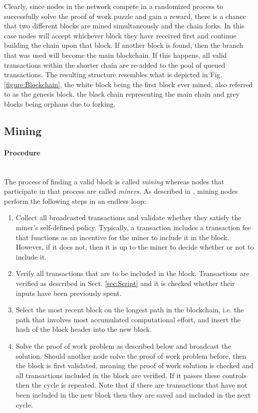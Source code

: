 \noindent
Clearly, since nodes in the network compete in a randomized process to successfully solve the proof of work puzzle and gain a reward, there is a chance that two different blocks are mined simultaneously and the chain forks. In this case nodes will accept whichever block they have received first and continue building the chain upon that block. If another block is found, then the branch that was used will become the main blockchain. If this happens, all valid transactions within the shorter chain are re-added to the pool of queued transactions. The resulting structure resembles what is depicted in Fig. \ref{figure:Blockchain}, the white block being the first block ever mined, also referred to as the genesis block, the black chain representing the main chain and grey blocks being orphans due to forking.

\subsection{Mining} \label{sec:Mining}

\paragraph{Procedure}~\\
The process of finding a valid block is called \emph{mining} whereas nodes that participate in that process are called \emph{miners}. As described in \cite{Clark_BitcoinInternals}, mining nodes perform the following steps in an endless loop:

\begin{enumerate}[label=\arabic*), leftmargin=1cm]
\item Collect all broadcasted transactions and validate whether they satisfy the miner's self-defined policy. Typically, a transaction includes a transaction fee that functions as an incentive for the miner to include it in the block. However, if it does not, then it is up to the miner to decide whether or not to include it.
\item Verify all transactions that are to be included in the block. Transactions are verified as described in Sect. \ref{sec:Script} and it is checked whether their inputs have been previously spent.
\item Select the most recent block on the longest path in the blockchain, i.e. the path that involves most accumulated computational effort, and insert the hash of the block header into the new block.
\item Solve the proof of work problem as described below and broadcast the solution. Should another node solve the proof of work problem before, then the block is first validated, meaning the proof of work solution is checked and all transactions included in the block are verified. If it passes these controls then the cycle is repeated. Note that if there are transactions that have not been included in the new block then they are saved and included in the next cycle.
\end{enumerate}


